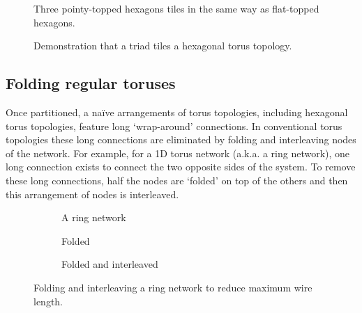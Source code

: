 			\begin{figure}
				\center
				
				
				\caption{Three pointy-topped hexagons tiles in the same way as flat-topped
				hexagons.}
				\label{fig:wrapped-triple-tiling}
			\end{figure}
			
			\begin{figure}
				\center
				
				
				\caption{Demonstration that a triad tiles a hexagonal torus topology.}
				\label{fig:triad-tiling}
			\end{figure}
		
		\subsection{Folding regular toruses}
			
			Once partitioned, a na\"ive arrangements of torus topologies, including
			hexagonal torus topologies, feature long `wrap-around' connections. In
			conventional torus topologies these long connections are eliminated by
			folding and interleaving nodes of the network. For example, for a 1D
			torus network (a.k.a. a ring network), one long connection exists to
			connect the two opposite sides of the system. To remove these long
			connections, half the nodes are `folded' on top of the others and then
			this arrangement of nodes is interleaved.
			
			\begin{figure}
				\center
				\begin{subfigure}[b]{0.39\linewidth}
					\center
					
					\caption{A ring network}
					\label{fig:ring-folding-row}
				\end{subfigure}
				\begin{subfigure}[b]{0.24\linewidth}
					\center
					
					\caption{Folded}
					\label{fig:ring-folding-folded}
				\end{subfigure}
				\begin{subfigure}[b]{0.35\linewidth}
					\center
					
					\caption{Folded and interleaved}
					\label{fig:ring-folding-interleaved}
				\end{subfigure}
				
				\caption{Folding and interleaving a ring network to reduce maximum wire
				length.}
				\label{fig:ring-folding}
			\end{figure}
			
